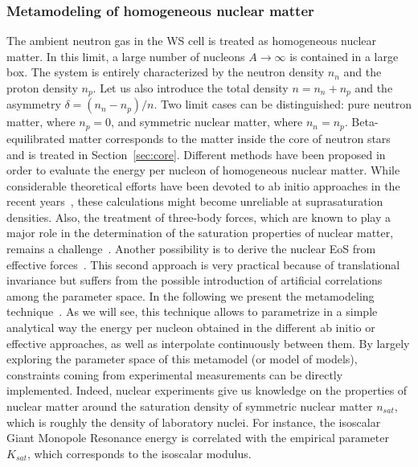 \subsubsection{Metamodeling of homogeneous nuclear matter}\label{subsubsec:hnm}

The ambient neutron gas in the WS cell is treated as homogeneous nuclear
matter.
In this limit, a large number of nucleons $A\longrightarrow \infty$ is 
contained in a large box. The system is entirely characterized by the neutron 
density $n_n$ and the proton density $n_p$. Let us also introduce the total 
density $n = n_n + n_p$ and the asymmetry $\delta = (n_n - n_p)/n$.
Two limit cases can be distinguished: pure neutron matter, where $n_p=0$,
and symmetric nuclear matter, where $n_n = n_p$. Beta-equilibrated 
matter corresponds to the matter inside the core of neutron stars and is 
treated in Section~\ref{sec:core}. Different methods have been proposed in
order to evaluate the energy per nucleon of homogeneous nuclear matter. While 
considerable theoretical efforts have been devoted to ab initio
approaches in the recent years~\cite{Gandolfi2014}, these calculations might 
become unreliable at suprasaturation densities. Also, the treatment of 
three-body forces, which are known to play a major role in the determination of 
the saturation properties of nuclear matter, remains a
challenge~\cite{Drischler2016}. Another possibility is to derive the nuclear 
EoS from effective forces~\cite{Chabanat1998}. This second approach is very 
practical because of translational invariance but suffers from the possible 
introduction of artificial correlations among the parameter space. In the 
following we present the metamodeling 
technique~\cite{Margueron2018a,Margueron2018b}. As we will see, this technique
allows to parametrize in a simple analytical way the energy per nucleon
obtained in the different ab initio or effective approaches, as well as
interpolate continuously between them. By largely exploring the parameter space
of this metamodel (or model of models), constraints coming from experimental
measurements can be directly implemented. Indeed, nuclear experiments give us 
knowledge on the properties of nuclear
matter around the saturation density of symmetric nuclear matter $n_{sat}$,
which is roughly the density of laboratory nuclei. For
instance, the isoscalar Giant Monopole Resonance energy is correlated
with the empirical parameter $K_{sat}$, which corresponds to the isoscalar
modulus.
%
